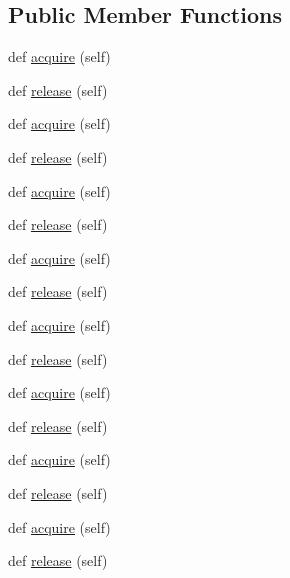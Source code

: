 \subsection*{Public Member Functions}
\begin{DoxyCompactItemize}
\item 
def \hyperlink{classwaflib_1_1_utils_1_1_lock_a5b80b181cd6b23dcf99ea4a1e3ea8967}{acquire} (self)
\item 
def \hyperlink{classwaflib_1_1_utils_1_1_lock_ae37814629bc262c42a537f426b3d4861}{release} (self)
\item 
def \hyperlink{classwaflib_1_1_utils_1_1_lock_a5b80b181cd6b23dcf99ea4a1e3ea8967}{acquire} (self)
\item 
def \hyperlink{classwaflib_1_1_utils_1_1_lock_ae37814629bc262c42a537f426b3d4861}{release} (self)
\item 
def \hyperlink{classwaflib_1_1_utils_1_1_lock_a5b80b181cd6b23dcf99ea4a1e3ea8967}{acquire} (self)
\item 
def \hyperlink{classwaflib_1_1_utils_1_1_lock_ae37814629bc262c42a537f426b3d4861}{release} (self)
\item 
def \hyperlink{classwaflib_1_1_utils_1_1_lock_a5b80b181cd6b23dcf99ea4a1e3ea8967}{acquire} (self)
\item 
def \hyperlink{classwaflib_1_1_utils_1_1_lock_ae37814629bc262c42a537f426b3d4861}{release} (self)
\item 
def \hyperlink{classwaflib_1_1_utils_1_1_lock_a5b80b181cd6b23dcf99ea4a1e3ea8967}{acquire} (self)
\item 
def \hyperlink{classwaflib_1_1_utils_1_1_lock_ae37814629bc262c42a537f426b3d4861}{release} (self)
\item 
def \hyperlink{classwaflib_1_1_utils_1_1_lock_a5b80b181cd6b23dcf99ea4a1e3ea8967}{acquire} (self)
\item 
def \hyperlink{classwaflib_1_1_utils_1_1_lock_ae37814629bc262c42a537f426b3d4861}{release} (self)
\item 
def \hyperlink{classwaflib_1_1_utils_1_1_lock_a5b80b181cd6b23dcf99ea4a1e3ea8967}{acquire} (self)
\item 
def \hyperlink{classwaflib_1_1_utils_1_1_lock_ae37814629bc262c42a537f426b3d4861}{release} (self)
\item 
def \hyperlink{classwaflib_1_1_utils_1_1_lock_a5b80b181cd6b23dcf99ea4a1e3ea8967}{acquire} (self)
\item 
def \hyperlink{classwaflib_1_1_utils_1_1_lock_ae37814629bc262c42a537f426b3d4861}{release} (self)
\item 

\end{DoxyCompactItemize}
